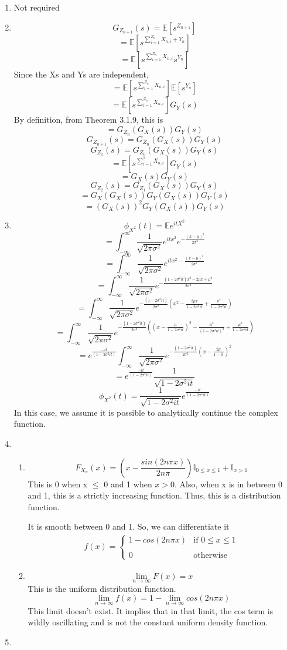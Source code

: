 \documentclass[a4paper,11pt]{article}
\begin{document}
\begin{enumerate}
\item
	Not required
	\item
\[G_{Z_{n+1}}(s)= \mathbb{E}[s^{Z_{n+1}}]\]
\[ = \mathbb{E}[s^{\sum_{i=1}^{Z_n} X_{n,i}+Y_n}]\]
\[ = \mathbb{E}[s^{\sum_{i=1}^{Z_n} X_{n,i}}s^{Y_n}]\]
Since the Xs and Ys are independent,
\[ = \mathbb{E}[s^{\sum_{i=1}^{Z_n} X_{n,i}}]\mathbb{E}[s^{Y_n}]\]
\[ = \mathbb{E}[s^{\sum_{i=1}^{Z_n} X_{n,i}}]G_Y(s)\]
By definition, from Theorem 3.1.9, this is
\[ = G_{Z_n}(G_X(s))G_Y(s)\]
\[G_{Z_{n+1}}(s) = G_{Z_n}(G_X(s))G_Y(s)\]
\[G_{Z_{1}}(s) = G_{Z_0}(G_X(s))G_Y(s)\]
\[ = \mathbb{E}[s^{\sum_{i=1}^{1} X_{n,i}}]G_Y(s)\]
\[ = G_X(s)G_Y(s)\]
\[G_{Z_{2}}(s)= G_{Z_1}(G_X(s))G_Y(s)\]
\[= G_X(G_X(s))G_Y(G_X(s))G_Y(s)\]
\[= (G_X(s))^2G_Y(G_X(s))G_Y(s)\]
\item
\[\phi_{X^2}(t)=\mathbb{E}e^{itX^2}\]
\[=\int_{-\infty}^{\infty}\frac{1}{\sqrt{2\pi \sigma^2}}e^{itx^2}e^{-\frac{(x-\mu)^2}{2\sigma^2}}\]
\[=\int_{-\infty}^{\infty}\frac{1}{\sqrt{2\pi \sigma^2}}e^{itx^2-\frac{(x-\mu)^2}{2\sigma^2}}\]
\[=\int_{-\infty}^{\infty}\frac{1}{\sqrt{2\pi \sigma^2}}e^{-\frac{(1-2\sigma^2it)x^2-2\mu x+\mu^2}{2\sigma^2}}\]
\[=\int_{-\infty}^{\infty}\frac{1}{\sqrt{2\pi \sigma^2}}e^{-\frac{(1-2\sigma^2it)}{2\sigma^2}(x^2-\frac{2\mu x}{1-2\sigma^2it}+\frac{\mu^2}{1-2\sigma^2it})}\]
\[=\int_{-\infty}^{\infty}\frac{1}{\sqrt{2\pi \sigma^2}}e^{-\frac{(1-2\sigma^2it)}{2\sigma^2}((x-\frac{\mu }{1-2\sigma^2it})^2-\frac{\mu^2}{(1-2\sigma^2it)^2}+\frac{\mu^2}{1-2\sigma^2it})}\]
\[=e^{\frac{- it}{(1-2\sigma^2it)}}\int_{-\infty}^{\infty}\frac{1}{\sqrt{2\pi \sigma^2}}e^{-\frac{(1-2\sigma^2it)}{2\sigma^2}(x-\frac{2\mu }{1-it})^2}\]
\[=e^{\frac{-it}{(1-2\sigma^2it)}}\frac{1}{\sqrt{1-2\sigma^2it}}\]
\[\phi_{X^2}(t)=\frac{1}{\sqrt{1-2\sigma^2it}} e^{\frac{-it}{(1-2\sigma^2it)}}\]
In this case, we assume it is possible to analytically continue the complex function.
\item
\begin{enumerate}
 \item 


\[F_{X_n}(x)=(x-\frac{sin(2n\pi x)}{2 n \pi})\mathbb{I}_{0 \leq x\leq1}+ \mathbb{I}_{x>1}\]
This is 0 when x $\leq$ 0 and 1 when $x>0$. Also, when x is in between 0 and 1, this is a strictly increasing function.
Thus, this is a distribution function.

It is smooth between 0 and 1. So, we can differentiate it
 \begin{align*}
  f(x)= \begin{cases}
       1 - cos(2n\pi x) & \text{if $0 \leq x \leq 1$}\\
      \\ 0 & \text{otherwise}
    \end{cases}
\end{align*}
\item
\[\lim_{n\to\infty} F(x)=x\]
This is the uniform distribution function.
\[\lim_{n\to\infty} f(x)= 1-\lim_{n\to\infty}cos(2n\pi x)\]
This limit doesn't exist. It implies that in that limit, the cos term is wildly oscillating and is not the constant 
uniform density function.
\end{enumerate}
\item 


\end{enumerate}
\end{document}
